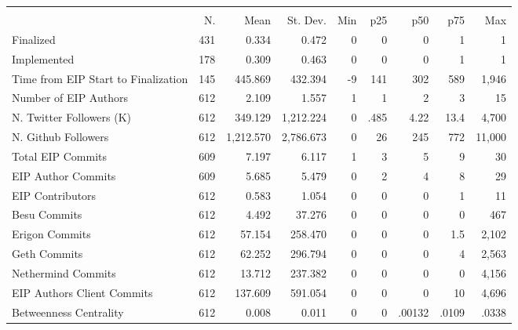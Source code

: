 {
\def\sym#1{\ifmmode^{#1}\else\(^{#1}\)\fi}
\begin{tabular}{l*{1}{rrrrrrrr}}
\hline\hline
                    &\multicolumn{8}{c}{}                                                                                   \\
                    &          N.&        Mean&    St. Dev.&         Min&         p25&         p50&         p75&         Max\\
\hline
Finalized           &         431&       0.334&       0.472&           0&           0&           0&           1&           1\\
Implemented         &         178&       0.309&       0.463&           0&           0&           0&           1&           1\\
Time from EIP Start to Finalization&         145&     445.869&     432.394&          -9&         141&         302&         589&       1,946\\
Number of EIP Authors&         612&       2.109&       1.557&           1&           1&           2&           3&          15\\
N. Twitter Followers (K)&         612&     349.129&   1,212.224&           0&        .485&        4.22&        13.4&       4,700\\
N. Github Followers &         612&   1,212.570&   2,786.673&           0&          26&         245&         772&      11,000\\
Total EIP Commits   &         609&       7.197&       6.117&           1&           3&           5&           9&          30\\
EIP Author Commits  &         609&       5.685&       5.479&           0&           2&           4&           8&          29\\
EIP Contributors    &         612&       0.583&       1.054&           0&           0&           0&           1&          11\\
Besu Commits        &         612&       4.492&      37.276&           0&           0&           0&           0&         467\\
Erigon Commits      &         612&      57.154&     258.470&           0&           0&           0&         1.5&       2,102\\
Geth Commits        &         612&      62.252&     296.794&           0&           0&           0&           4&       2,563\\
Nethermind Commits  &         612&      13.712&     237.382&           0&           0&           0&           0&       4,156\\
EIP Authors Client Commits&         612&     137.609&     591.054&           0&           0&           0&          10&       4,696\\
Betweenness Centrality&         612&       0.008&       0.011&           0&           0&      .00132&       .0109&       .0338\\
\hline\hline
\end{tabular}
}
